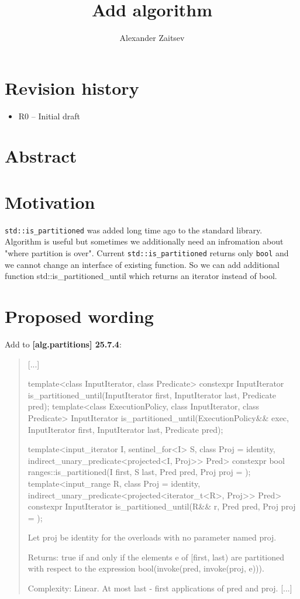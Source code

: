 \documentclass{wg21}
\title{Add \cc{std::is_partitioned_until} algorithm}
\author{Alexander Zaitsev}{zamazan4ik@tut.by, zamazan4ik@gmail.com}
\newcommand{\cc}[1]{\texttt{#1}}
\begin{document}
\maketitle

\section{Revision history}
\begin{itemize}
  \item R0 -- Initial draft
\end{itemize}


\section{Abstract}


\section{Motivation}
\cc{std::is_partitioned} was added long time ago to the standard library. Algorithm is useful but sometimes we additionally need an infromation about "where partition is over". Current \cc{std::is_partitioned} returns only \cc{bool} and we cannot change an interface of existing function. So we can add additional function {std::is_partitioned_until} which returns an iterator instead of bool.

\section{Proposed wording}
Add to \textbf{[alg.partitions] 25.7.4}:
\begin{quote}
[...]	
\begin{itemdecl}
template<class InputIterator, class Predicate>
  constexpr InputIterator is_partitioned_until(InputIterator first, InputIterator last,
                                               Predicate pred);
template<class ExecutionPolicy, class InputIterator, class Predicate>
  InputIterator is_partitioned_until(ExecutionPolicy&& exec, InputIterator first,
                                     InputIterator last, Predicate pred);
\end{itemdecl}

\begin{itemdecl}
template<input_iterator I, sentinel_for<I> S, class Proj = identity,
         indirect_unary_predicate<projected<I, Proj>> Pred>
  constexpr bool ranges::is_partitioned(I first, S last, Pred pred, Proj proj = {});	
template<input_range R, class Proj = identity, 
         indirect_unary_predicate<projected<iterator_t<R>, Proj>> Pred>
  constexpr InputIterator is_partitioned_until(R&& r, Pred pred, Proj proj = {});
\end{itemdecl}
    Let proj be identity{} for the overloads with no parameter named proj.
    
    Returns: true if and only if the elements e of [first, last) are partitioned with respect to the expression bool(invoke(pred, invoke(proj, e))).
    
    Complexity: Linear. At most last - first applications of pred and proj.
[...]
\end{quote}
\end{document}
